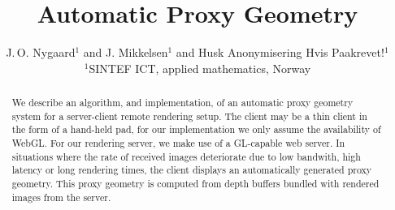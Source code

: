 

\title[Automatic Proxy Geometry]%
      {Automatic Proxy Geometry}

\author[J.\,O. Nygaard \& J. Mikkelsen]
       {J.\,O. Nygaard$^{1}$
        and J. Mikkelsen$^{1}$
        and Husk Anonymisering Hvis Paakrevet!$^{1}$
        \\
         $^1$SINTEF ICT, applied mathematics, Norway
       }


%





\maketitle

\begin{abstract}
   We describe an algorithm, and implementation, of an automatic proxy geometry
   system for a server-client remote rendering setup. The client may be a thin
   client in the form of a hand-held pad, for our implementation we only assume
   the availability of WebGL. For our rendering server, we make use of a
   GL-capable web server. In situations where the rate of received images
   deteriorate due to low bandwith, high latency or long rendering times, the
   client displays an automatically generated proxy geometry. This proxy
   geometry is computed from depth buffers bundled with rendered images from the
   server.

\begin{classification} %
\end{classification}

\end{abstract}





